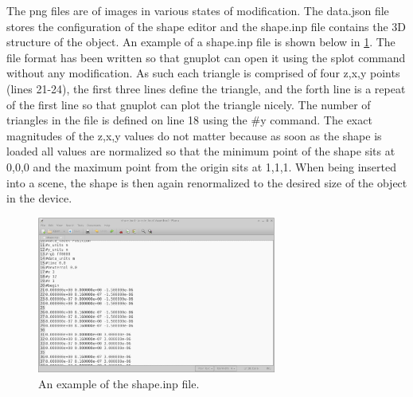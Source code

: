 The png files are of images in various states of modification.  The data.json file stores the configuration of the shape editor and the shape.inp file contains the 3D structure of the object.  An example of a shape.inp file is shown below in \ref{fig:shape_file_format}. The file format has been written so that gnuplot can open it using the splot command without any modification.  As such each triangle is comprised of four z,x,y points (lines 21-24), the first three lines define the triangle, and the forth line is a repeat of the first line so that gnuplot can plot the triangle nicely.  The number of triangles in the file is defined on line 18 using the \#y command.  The exact magnitudes of the z,x,y values do not matter because as soon as the shape is loaded all values are normalized so that the minimum point of the shape sits at 0,0,0 and the maximum point from the origin sits at 1,1,1.  When being inserted into a scene, the shape is then again renormalized to the desired size of the object in the device.


\begin{figure}[H]
\centering
\includegraphics[width=0.7\textwidth,height=0.4\textheight]{./images/database_shapes/shape_file_format.png}
\caption{An example of the shape.inp file.}
\label{fig:shape_file_format}
\end{figure}



